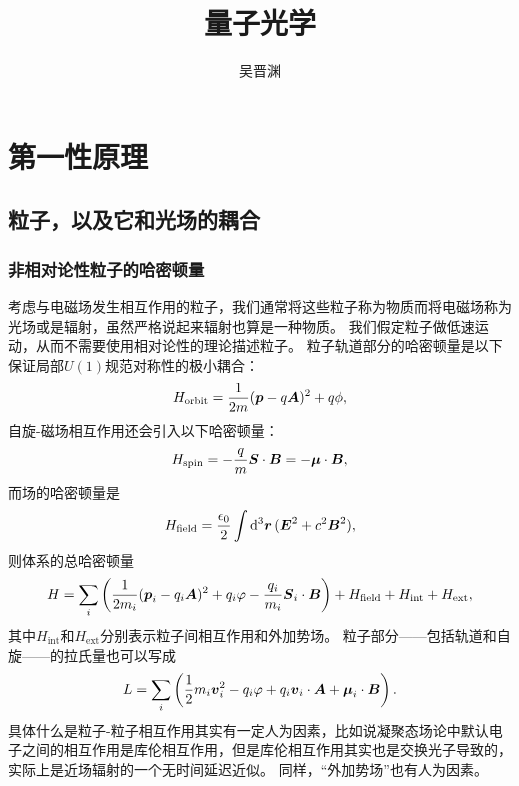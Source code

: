 \documentclass[UTF8, a4paper]{ctexart}
\title{量子光学}
\author{吴晋渊}
\begin{document}
\maketitle

\section{第一性原理}

\subsection{粒子，以及它和光场的耦合}

\subsubsection{非相对论性粒子的哈密顿量}

考虑与电磁场发生相互作用的粒子，我们通常将这些粒子称为物质而将电磁场称为光场或是辐射，虽然严格说起来辐射也算是一种物质。
我们假定粒子做低速运动，从而不需要使用相对论性的理论描述粒子。
粒子轨道部分的哈密顿量是以下保证局部$U(1)$规范对称性的极小耦合：
\begin{equation}
    {H}_\text{orbit} = \frac{1}{2m} ({\vb*{p}} - q \vb*{A})^2 + q \phi,
    \label{eq:minimal-coupling}
\end{equation}
自旋-磁场相互作用还会引入以下哈密顿量：
\begin{equation}
    {H}_\text{spin} = - \frac{q}{m} {\vb*{S}} \cdot \vb*{B} = - \vb*{\mu} \cdot \vb*{B},
\end{equation}
而场的哈密顿量是
\begin{equation}
    {H}_\text{field} = \frac{\epsilon_0}{2} \int \dd[3]{\vb*{r}} (\vb*{E}^2 + c^2 \vb*{B}^2),
\end{equation}
则体系的总哈密顿量
\begin{equation}
    {H} = \sum_i \left( \frac{1}{2m_i} ({\vb*{p}_i} - q_i \vb*{A})^2 + q_i \varphi - \frac{q_i}{m_i} \vb*{S}_i \cdot \vb*{B} \right) + {H}_\text{field} + {H}_\text{int} + {H}_\text{ext},
\end{equation}
其中${H}_\text{int}$和${H}_\text{ext}$分别表示粒子间相互作用和外加势场。
粒子部分——包括轨道和自旋——的拉氏量也可以写成
\begin{equation}
    L = \sum_i \left( \frac{1}{2} m_i \vb*{v}_i^2 - q_i \varphi + q_i \vb*{v}_i \cdot \vb*{A} + \vb*{\mu}_i \cdot \vb*{B} \right).
\end{equation}
具体什么是粒子-粒子相互作用其实有一定人为因素，比如说凝聚态场论中默认电子之间的相互作用是库伦相互作用，但是库伦相互作用其实也是交换光子导致的，实际上是近场辐射的一个无时间延迟近似。
同样，“外加势场”也有人为因素。
\end{document}
